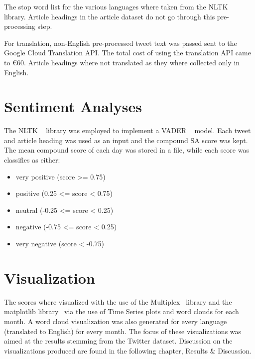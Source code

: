 \noindent The stop word list for the various languages where taken from the \ac{NLTK} ~\citep{bird2009natural} library.
Article headings in the article dataset do not go through this pre-processing step.

For translation, non-English pre-processed tweet text was passed sent to the Google Cloud Translation \ac{API}.
The total cost of using the translation \ac{API} came to €60.
Article headings where not translated as they where collected only in English.

\section{Sentiment Analyses}

The \ac{NLTK} ~\citep{bird2009natural} library was employed to implement a \ac{VADER} ~\citep{Hutto_Gilbert_2014} model.
Each tweet and article heading was used as an input and the compound \ac{SA} score was kept.
The mean compound score of each day was stored in a file, while each score was classifies as either:

\begin{itemize}
    \item very positive (score >= 0.75)
    \item positive (0.25 <= score < 0.75)
    \item neutral (-0.25 <= score < 0.25)
    \item negative (-0.75 <= score < 0.25)
    \item very negative (score < -0.75)
\end{itemize}

\section{Visualization}

The  scores where visualized with the use of the Multiplex~\citep{Mamo2021} library and the matplotlib library~\citep{Hunter:2007} via the use of Time Series plots and word clouds for each month.
A word cloud visualization was also generated for every language (translated to English) for every month.
The focus of these visualizations was aimed at the results stemming from the Twitter dataset.
Discussion on the visualizations produced are found in the following chapter, Results \& Discussion.